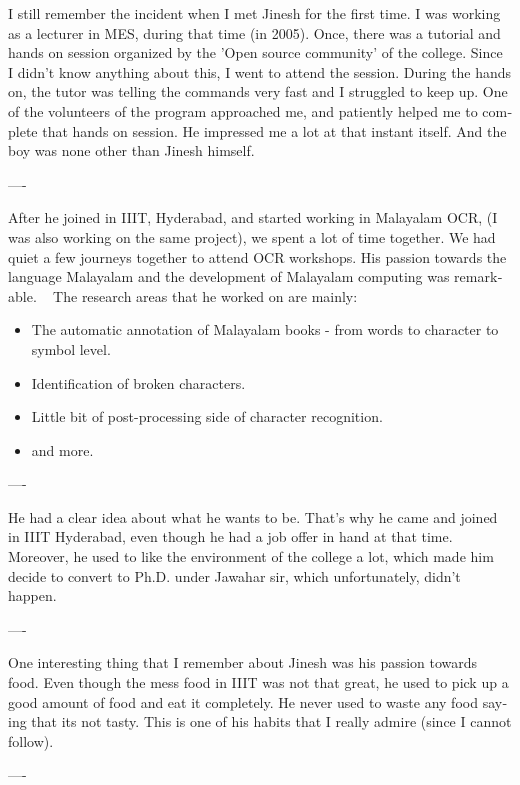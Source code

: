 \begin{english}
I still remember the incident when I met Jinesh for the first time. I was working as a lecturer in MES, during that time (in 2005). Once, there was a tutorial and hands on session organized by the 'Open source community' of the college. Since I didn’t know anything about this, I went to attend the session. During the hands on, the tutor was telling the commands very fast and I struggled to keep up. One of the volunteers of the program approached me, and patiently helped me to complete that hands on session. He impressed me a lot at that instant itself. And the boy was none other than Jinesh himself.
\begin{center}
---- 
\end{center}
After he joined in IIIT, Hyderabad, and started working in Malayalam OCR, (I was also working on the same project), we spent a lot of time together. We had quiet a few journeys together to attend OCR workshops. His passion towards the language Malayalam and the development of Malayalam computing was remarkable.
 
The research areas that he worked on are mainly:
\begin{itemize}
\item The automatic annotation of Malayalam books - from words to character to symbol level.
\item Identification of broken characters.
\item Little bit of post-processing side of character recognition.
\item and more.
\end{itemize}
\begin{center}
---- 
\end{center}
He had a clear idea about what he wants to be. That’s why he came and joined in IIIT Hyderabad, even though he had a job offer in hand at that time. Moreover, he used to like the environment of the college a lot, which made him decide to convert to Ph.D. under Jawahar sir, which unfortunately, didn’t happen.
\begin{center}
---- 
\end{center}
One interesting thing that I remember about Jinesh was his passion towards food. Even though the mess food in IIIT was not that great, he used to pick up a good amount of food and eat it completely. He never used to waste any food saying that its not tasty. This is one of his habits that I really admire (since I cannot follow).
\begin{center}
---- 
\end{center}

\end{english}
